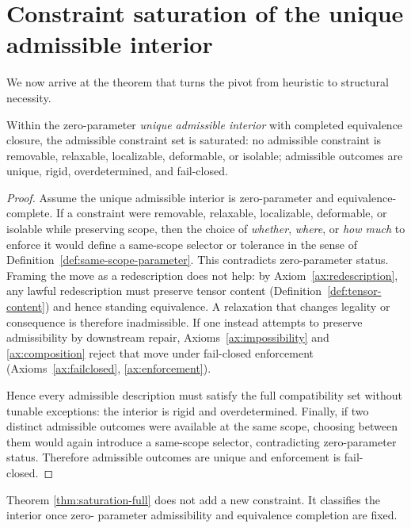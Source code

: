\section{Constraint saturation of the unique admissible interior}
We now arrive at the theorem that turns the pivot from heuristic to structural necessity.

\begin{theorem}\label{thm:saturation-full}
Within the zero-parameter \emph{unique admissible interior} with completed equivalence closure, the admissible
constraint set is saturated: no admissible constraint is removable, relaxable,
localizable, deformable, or isolable; admissible outcomes are unique, rigid, overdetermined, and
fail-closed.
\end{theorem}
\begin{proof}
Assume the unique admissible interior is zero-parameter and equivalence-complete.
If a constraint were removable, relaxable, localizable, deformable, or isolable while preserving scope,
then the choice of \emph{whether}, \emph{where}, or \emph{how much} to enforce it would define a same-scope
selector or tolerance in the sense of Definition~\ref{def:same-scope-parameter}. This contradicts
zero-parameter status.
Framing the move as a redescription does not help: by Axiom~\ref{ax:redescription}, any lawful
redescription must preserve tensor content (Definition~\ref{def:tensor-content}) and hence standing
equivalence. A relaxation that changes legality or consequence is therefore inadmissible.
If one instead attempts to preserve admissibility by downstream repair, Axioms~\ref{ax:impossibility}
and \ref{ax:composition} reject that move under fail-closed enforcement
(Axioms~\ref{ax:failclosed}, \ref{ax:enforcement}).

Hence every admissible description must satisfy the full compatibility set without tunable exceptions:
the interior is rigid and overdetermined.
Finally, if two distinct admissible outcomes were available at the same scope, choosing between them
would again introduce a same-scope selector, contradicting zero-parameter status.
Therefore admissible outcomes are unique and enforcement is fail-closed.
\end{proof}


\begin{remark}
Theorem \ref{thm:saturation-full} does not add a new constraint. It classifies the interior once zero-
parameter admissibility and equivalence completion are fixed.
\end{remark}


